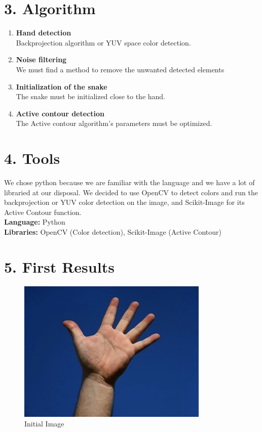 \documentclass{report}
\begin{document}
\section*{3. Algorithm}

\begin{enumerate}

\item \textbf{Hand detection}\\
Backprojection algorithm or YUV space color detection. 

\item \textbf{Noise filtering}\\
We must find a method to remove the unwanted detected elements

\item \textbf{Initialization of the snake} \\
The snake must be initialized close to the hand.

\item \textbf{Active contour detection} \\
The Active contour algorithm's parameters must be optimized. 

\end{enumerate}

\section*{4. Tools}

We chose python because we are familiar with the language and we have a lot of libraried at our disposal. We decided to use OpenCV to detect colors and run the backprojection or YUV color detection on the image, and Scikit-Image for its Active Contour function.\\

\textbf{Language:} Python\\

\textbf{Libraries:} OpenCV (Color detection), Scikit-Image (Active Contour)\\

\newpage
\section*{5. First Results}

\begin{figure}[H]
							\begin{center}
							\includegraphics[width=0.5\linewidth]{hand2.jpg}
              \caption*{Initial Image}
							\end{center}
\end{figure}
\end{document}
